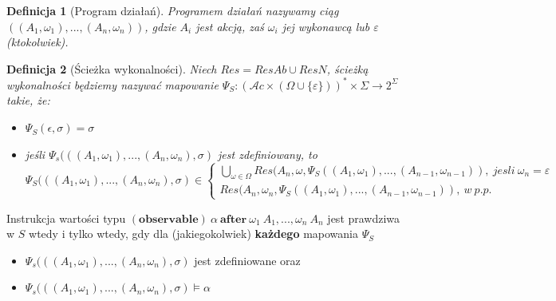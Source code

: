\documentclass[11pt,a4paper]{article}
\newtheorem{definition}{Definicja}[section]
\begin{document}
    \begin{definition}[Program działań]
    Programem działań nazywamy ciąg $((A_1, \omega_1),...,(A_n,\omega_n))$, gdzie $A_i$ jest akcją, zaś $\omega_i$ jej wykonawcą lub $\varepsilon$ (ktokolwiek). 
    \end{definition}

    \begin{definition}[Ścieżka wykonalności]
    Niech $Res = ResAb \cup ResN$, ścieżką wykonalności będziemy nazywać mapowanie $\Psi_S: (\mathcal{A}c \times (\Omega \cup \{ \varepsilon \}))^* \times \Sigma \rightarrow 2^\Sigma$ takie, że:
    \begin{itemize}
        \item $\Psi_S(\epsilon, \sigma) = \sigma$
        \item jeśli $\Psi_s(((A_1, \omega_1), ..., (A_n, \omega_n), \sigma)$ jest zdefiniowany, to    
    \[
    \Psi_S(((A_1, \omega_1), ..., (A_n, \omega_n), \sigma) \in \left \{
        \begin{array}{ll}
             \bigcup\limits_{\omega \in \Omega} Res(A_n, \omega, \Psi_S((A_1, \omega_1), ..., (A_{n-1}, \omega_{n-1})),~jesli~\omega_n = \varepsilon\\
             Res(A_n, \omega_n, \Psi_S((A_1, \omega_1), ..., (A_{n-1}, \omega_{n-1})),~w~p.p.
         \end{array}
     \right.
    \]
    \end{itemize}
    \end{definition}
    
    Instrukcja wartości typu $(\mathbf{observable})~\alpha~\mathbf{after}~\omega_1~A_1,...,\omega_n~A_n$ jest prawdziwa w $S$ wtedy i tylko wtedy, gdy dla (jakiegokolwiek) \textbf{każdego} mapowania $\Psi_S$
    \begin{itemize}
        \item $\Psi_s(((A_1, \omega_1), ..., (A_n, \omega_n), \sigma)$ jest zdefiniowane oraz 
        \item $\Psi_s(((A_1, \omega_1), ..., (A_n, \omega_n), \sigma) \models \alpha$
    \end{itemize}
    
\end{document}

